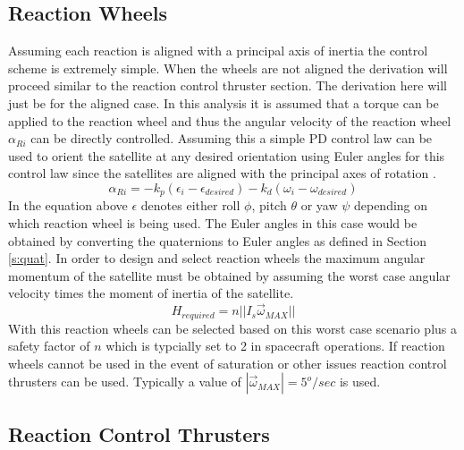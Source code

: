 \documentclass{article}
\begin{document}
\subsection{Reaction Wheels}

Assuming each reaction is aligned with a principal axis of inertia the
control scheme is extremely simple. When the wheels are not aligned
the derivation will proceed similar to the reaction control thruster
section. The derivation here will just be for the aligned case. In
this analysis it is assumed that a torque can be applied to the
reaction wheel and thus the angular velocity of the reaction wheel
$\alpha_{Ri}$ can be directly controlled. Assuming this a simple PD
control law can be used to orient the satellite at any desired
orientation using Euler angles for this control law since the
satellites are aligned with the principal axes of rotation \cite{etkins}.
\begin{equation}
  \alpha_{Ri} = -k_p(\epsilon_i-\epsilon_{desired})-k_d(\omega_i-\omega_{desired})
\end{equation}
In the equation above $\epsilon$ denotes either roll $\phi$, pitch
$\theta$ or yaw $\psi$ depending on which reaction wheel is being
used. The Euler angles in this case would be obtained by converting
the quaternions to Euler angles as defined in Section \ref{s:quat}.
In order to design and select reaction wheels the maximum angular
momentum of the satellite must be obtained by assuming the worst case angular
velocity times the moment of inertia of the satellite.
\begin{equation}
  H_{required} = n||I_s\vec{\omega}_{MAX}||
\end{equation}
With this reaction wheels can be selected based on this worst case
scenario plus a safety factor of $n$ which is typcially set to 2 in
spacecraft operations. If reaction wheels cannot be used in the event
of saturation or other issues reaction control thrusters can be
used. Typically a value of $|\vec{\omega}_{MAX}|=5^o/sec$ is used. 

\subsection{Reaction Control Thrusters}
\end{document}
